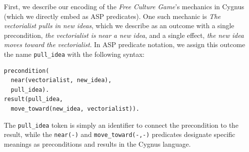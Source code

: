 \documentclass[12pt]{report}
\begin{document}
First, we describe our encoding of the \textit{Free Culture Game}'s mechanics in
Cygnus (which we directly embed as ASP predicates). One such mechanic is
{\em The vectorialist pulls in new ideas}, which we describe as an outcome
with a single precondition, {\em the vectorialist is near a new idea}, and
a single effect, {\em the new idea moves toward the vectorialist}. In ASP
predicate notation, we assign this outcome the name \verb|pull_idea| with
the following syntax:

\begin{verbatim}
precondition(
  near(vectorialist, new_idea), 
  pull_idea).
result(pull_idea, 
  move_toward(new_idea, vectorialist)).
\end{verbatim}

The \verb|pull_idea| token is simply an identifier to connect the
precondition to the result, while the \verb|near(-)| and
\verb|move_toward(-,-)| predicates designate specific meanings as preconditions and results in the Cygnus language.
\end{document}
